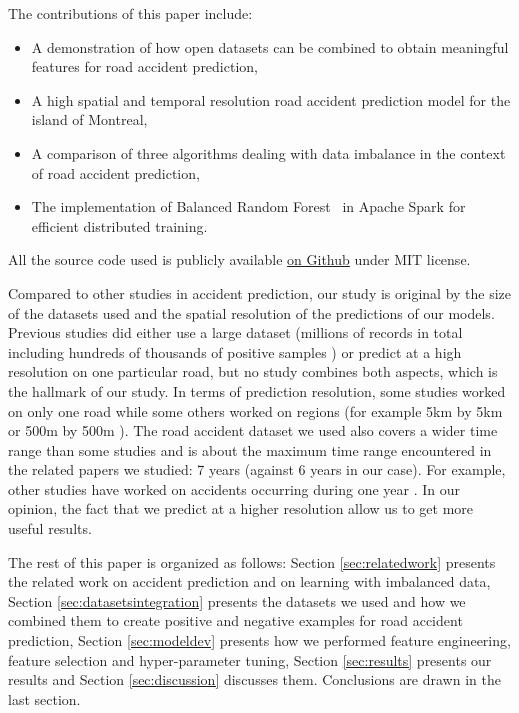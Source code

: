 \documentclass[conference]{IEEEtran}
\begin{document}
The contributions of this paper include: 
\begin{itemize}
\item A demonstration of how open datasets can be combined to obtain
meaningful features for road accident prediction,
\item A high spatial and temporal resolution road accident prediction model for the island of Montreal,
\item A comparison of three algorithms dealing with data imbalance in the context of road accident prediction,
\item The implementation of Balanced Random Forest~\cite{Chen2004} in Apache Spark for efficient distributed training.
\end{itemize}

All the source code used is publicly available \href{https://github.com/big-data-lab-team/accident-prediction-montreal}{on Github} under MIT license.

Compared to other studies in accident prediction, our study is original by the size of the datasets used and the spatial resolution of the predictions of our models. Previous studies did either use a large dataset (millions of records in total including hundreds of thousands of positive samples \cite{QChen2016}) or predict at a high resolution on one particular road, but no study combines both aspects, which is the hallmark of our study. In terms of prediction resolution, some studies worked on only one road \cite{Chang2005} \cite{Chang2005b} \cite{Lin2015} while some others worked on regions (for example 5km by 5km \cite{QChen2016} or 500m by 500m \cite{Yuan2018}). The road accident dataset we used also covers a wider time range than some studies and is about the maximum time range encountered in the related papers we studied: 7 years \cite{Yuan2018} (against 6 years in our case). For example, other studies have worked on accidents occurring during one year \cite{Chang2005} \cite{Chang2005b} \cite{QChen2016} \cite{Lin2015}. In our opinion, the fact that we predict at a higher resolution allow us to get more useful results.

The rest of this paper is organized as follows: Section \ref{sec:relatedwork} presents
the related work on accident prediction and on learning with imbalanced data, Section \ref{sec:datasetsintegration} presents the datasets we used and
how we combined them to create positive and negative examples for road
accident prediction, Section \ref{sec:modeldev} presents how we performed feature
engineering, feature selection and hyper-parameter tuning, Section \ref{sec:results}
presents our results and Section \ref{sec:discussion} discusses them.
Conclusions are drawn in the last section.
\end{document}
